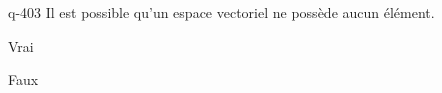 \begin{truefalse}{q-403}
Il est possible qu'un espace vectoriel ne possède aucun élément.
\item Vrai
\item* Faux
\end{truefalse}

